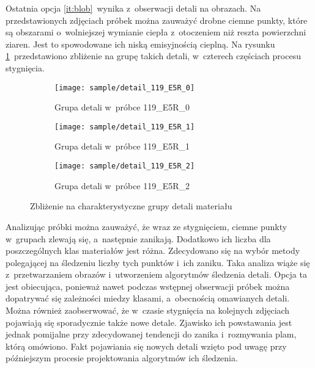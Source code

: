 Ostatnia opcja \ref{it:blob}~wynika z~obserwacji detali na obrazach.
Na przedstawionych zdjęciach próbek można zauważyć drobne ciemne punkty, które
są obszarami o~wolniejszej wymianie ciepła z~otoczeniem niż reszta powierzchni
ziaren.
Jest to spowodowane ich niską emisyjnością cieplną.
Na rysunku \ref{fig:blob_detail}~przedstawiono zbliżenie na grupę takich detali,
w~czterech częściach procesu stygnięcia.
\begin{figure}[htb]
    \hspace*{\fill}
    \begin{subfigure}{0.3\textwidth}
        \centering
        \texttt{[image: sample/detail\_119\_E5R\_0]}
        \caption{Grupa detali w~próbce 119\_E5R\_0}
    \end{subfigure}
    \hfill
    \centering
    \begin{subfigure}{0.3\textwidth}
        \centering
        \texttt{[image: sample/detail\_119\_E5R\_1]}
        \caption{Grupa detali w~próbce 119\_E5R\_1}
    \end{subfigure}
    \hfill
    \begin{subfigure}{0.3\textwidth}
        \centering
        \texttt{[image: sample/detail\_119\_E5R\_2]}
        \caption{Grupa detali w~próbce 119\_E5R\_2}
    \end{subfigure}
    \hspace*{\fill}
    \caption{Zbliżenie na charakterystyczne grupy detali materiału}
    \label{fig:blob_detail}
\end{figure}

Analizując próbki można zauważyć, że wraz ze stygnięciem, ciemne punkty
w~grupach zlewają się, a~następnie zanikają.
Dodatkowo ich liczba dla poszczególnych klas materiałów jest różna.
Zdecydowano się na wybór metody polegającej na śledzeniu liczby tych punktów
i~ich zaniku.
Taka analiza wiąże się z~przetwarzaniem obrazów i~utworzeniem algorytmów
śledzenia detali.
Opcja ta jest obiecująca, ponieważ nawet podczas wstępnej obserwacji próbek
można dopatrywać się zależności miedzy klasami, a~obecnością omawianych detali.
Można również zaobserwować, że w~czasie stygnięcia na kolejnych zdjęciach
pojawiają się sporadycznie także nowe detale.
Zjawisko ich powstawania jest jednak pomijalne przy zdecydowanej tendencji do
zanika i~rozmywania plam, którą omówiono.
Fakt pojawiania się nowych detali wzięto pod uwagę przy późniejszym procesie
projektowania algorytmów ich śledzenia.

